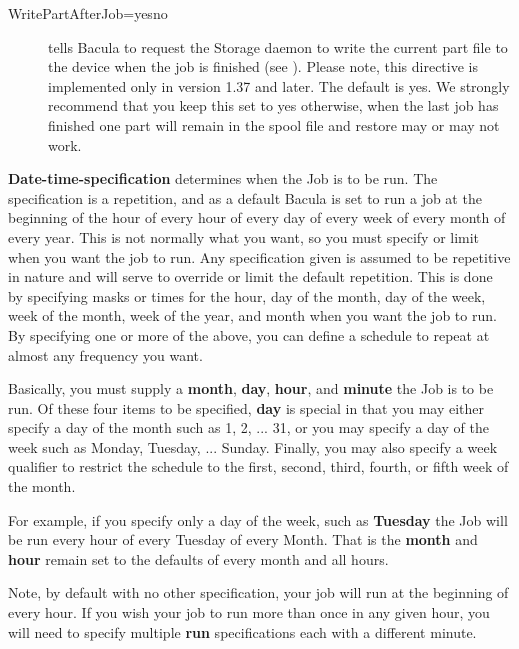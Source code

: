 \begin{description}
\begin{description}
   
\item [WritePartAfterJob=yes\vb{}no]
   tells Bacula to request the Storage daemon to write the current part
   file to the device when the job is finished (see ).  Please note,
   this directive is implemented only in version 1.37 and later.  The
   default is yes.  We strongly recommend that you keep this set to yes
   otherwise, when the last job has finished one part will remain in the
   spool file and restore may or may not work.

\end{description}

{\bf Date-time-specification} determines when the  Job is to be run. The
specification is a repetition, and as  a default Bacula is set to run a job at
the beginning of the  hour of every hour of every day of every week of every
month  of every year. This is not normally what you want, so you  must specify
or limit when you want the job to run. Any  specification given is assumed to
be repetitive in nature and  will serve to override or limit the default
repetition. This  is done by specifying masks or times for the hour, day of the
month, day of the week, week of the month, week of the year,  and month when
you want the job to run. By specifying one or  more of the above, you can
define a schedule to repeat at  almost any frequency you want.  

Basically, you must supply a {\bf month}, {\bf day}, {\bf hour}, and  {\bf
minute} the Job is to be run. Of these four items to be specified,  {\bf day}
is special in that you may either specify a day of the month  such as 1, 2,
... 31, or you may specify a day of the week such  as Monday, Tuesday, ...
Sunday. Finally, you may also specify a  week qualifier to restrict the
schedule to the first, second, third,  fourth, or fifth week of the month.  

For example, if you specify only a day of the week, such as {\bf Tuesday}  the
Job will be run every hour of every Tuesday of every Month. That  is the {\bf
month} and {\bf hour} remain set to the defaults of  every month and all
hours.  

Note, by default with no other specification, your job will run  at the
beginning of every hour. If you wish your job to run more than  once in any
given hour, you will need to specify multiple {\bf run}  specifications each
with a different minute.  


\end{description}
